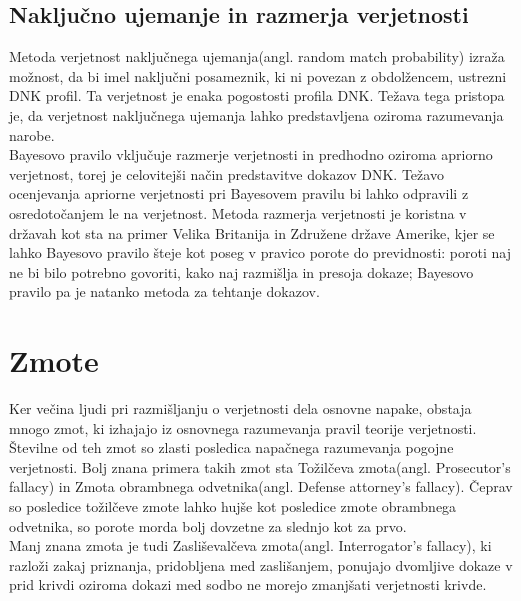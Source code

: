 \documentclass[12pt,a4paper]{amsart}
\theoremstyle{definition} %
\theoremstyle{plain} %
\begin{document}
\subsection{Naključno ujemanje in razmerja verjetnosti}
Metoda verjetnost naključnega ujemanja(angl. random match probability) izraža možnost, da bi imel naključni posameznik, ki ni povezan z obdolžencem,
ustrezni DNK profil. Ta verjetnost je enaka pogostosti profila DNK. Težava tega pristopa je, da verjetnost naključnega ujemanja lahko predstavljena
oziroma razumevanja narobe. \\
 
Bayesovo pravilo vključuje razmerje verjetnosti in predhodno oziroma apriorno verjetnost, torej je celovitejši način predstavitve dokazov DNK.
Težavo ocenjevanja apriorne verjetnosti pri Bayesovem pravilu bi lahko odpravili z osredotočanjem le na verjetnost. Metoda razmerja verjetnosti je
koristna v državah kot sta na primer Velika Britanija in Združene države Amerike, kjer se lahko Bayesovo pravilo šteje kot poseg v pravico porote
do previdnosti: poroti naj ne bi bilo potrebno govoriti, kako naj razmišlja in presoja dokaze; Bayesovo pravilo pa je natanko metoda za
tehtanje dokazov. \vspace{3mm}

\section{Zmote}
Ker večina ljudi pri razmišljanju o verjetnosti dela osnovne napake, obstaja mnogo zmot, ki izhajajo iz osnovnega razumevanja pravil
teorije verjetnosti. Številne od teh zmot so zlasti posledica napačnega razumevanja pogojne verjetnosti. Bolj znana primera takih zmot sta
Tožilčeva zmota(angl. Prosecutor’s fallacy) in Zmota obrambnega odvetnika(angl. Defense attorney's fallacy). Čeprav so posledice tožilčeve zmote 
lahko hujše kot posledice zmote obrambnega odvetnika, so porote morda bolj dovzetne za slednjo kot za prvo. \\
 
Manj znana zmota je tudi Zasliševalčeva zmota(angl. Interrogator’s fallacy), ki razloži zakaj priznanja, pridobljena med zaslišanjem, ponujajo
dvomljive dokaze v prid krivdi oziroma dokazi med sodbo ne morejo zmanjšati verjetnosti krivde.
\end{document}

